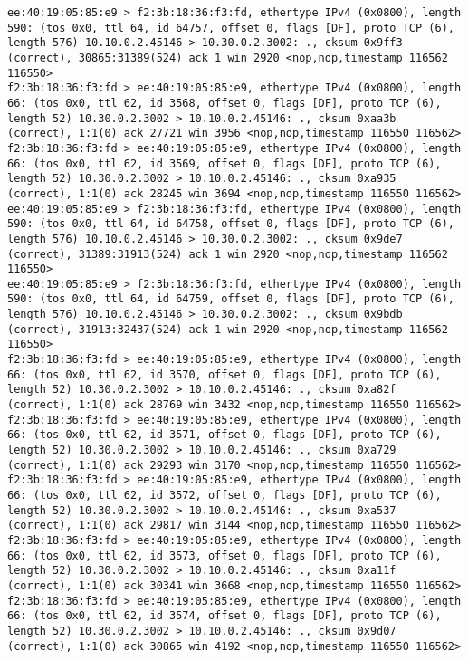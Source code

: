 \documentclass[a4paper,12pt]{article}
\begin{document}
\begin{Verbatim}
ee:40:19:05:85:e9 > f2:3b:18:36:f3:fd, ethertype IPv4 (0x0800), length 590: (tos 0x0, ttl 64, id 64757, offset 0, flags [DF], proto TCP (6), length 576) 10.10.0.2.45146 > 10.30.0.2.3002: ., cksum 0x9ff3 (correct), 30865:31389(524) ack 1 win 2920 <nop,nop,timestamp 116562 116550>
f2:3b:18:36:f3:fd > ee:40:19:05:85:e9, ethertype IPv4 (0x0800), length 66: (tos 0x0, ttl 62, id 3568, offset 0, flags [DF], proto TCP (6), length 52) 10.30.0.2.3002 > 10.10.0.2.45146: ., cksum 0xaa3b (correct), 1:1(0) ack 27721 win 3956 <nop,nop,timestamp 116550 116562>
f2:3b:18:36:f3:fd > ee:40:19:05:85:e9, ethertype IPv4 (0x0800), length 66: (tos 0x0, ttl 62, id 3569, offset 0, flags [DF], proto TCP (6), length 52) 10.30.0.2.3002 > 10.10.0.2.45146: ., cksum 0xa935 (correct), 1:1(0) ack 28245 win 3694 <nop,nop,timestamp 116550 116562>
ee:40:19:05:85:e9 > f2:3b:18:36:f3:fd, ethertype IPv4 (0x0800), length 590: (tos 0x0, ttl 64, id 64758, offset 0, flags [DF], proto TCP (6), length 576) 10.10.0.2.45146 > 10.30.0.2.3002: ., cksum 0x9de7 (correct), 31389:31913(524) ack 1 win 2920 <nop,nop,timestamp 116562 116550>
ee:40:19:05:85:e9 > f2:3b:18:36:f3:fd, ethertype IPv4 (0x0800), length 590: (tos 0x0, ttl 64, id 64759, offset 0, flags [DF], proto TCP (6), length 576) 10.10.0.2.45146 > 10.30.0.2.3002: ., cksum 0x9bdb (correct), 31913:32437(524) ack 1 win 2920 <nop,nop,timestamp 116562 116550>
f2:3b:18:36:f3:fd > ee:40:19:05:85:e9, ethertype IPv4 (0x0800), length 66: (tos 0x0, ttl 62, id 3570, offset 0, flags [DF], proto TCP (6), length 52) 10.30.0.2.3002 > 10.10.0.2.45146: ., cksum 0xa82f (correct), 1:1(0) ack 28769 win 3432 <nop,nop,timestamp 116550 116562>
f2:3b:18:36:f3:fd > ee:40:19:05:85:e9, ethertype IPv4 (0x0800), length 66: (tos 0x0, ttl 62, id 3571, offset 0, flags [DF], proto TCP (6), length 52) 10.30.0.2.3002 > 10.10.0.2.45146: ., cksum 0xa729 (correct), 1:1(0) ack 29293 win 3170 <nop,nop,timestamp 116550 116562>
f2:3b:18:36:f3:fd > ee:40:19:05:85:e9, ethertype IPv4 (0x0800), length 66: (tos 0x0, ttl 62, id 3572, offset 0, flags [DF], proto TCP (6), length 52) 10.30.0.2.3002 > 10.10.0.2.45146: ., cksum 0xa537 (correct), 1:1(0) ack 29817 win 3144 <nop,nop,timestamp 116550 116562>
f2:3b:18:36:f3:fd > ee:40:19:05:85:e9, ethertype IPv4 (0x0800), length 66: (tos 0x0, ttl 62, id 3573, offset 0, flags [DF], proto TCP (6), length 52) 10.30.0.2.3002 > 10.10.0.2.45146: ., cksum 0xa11f (correct), 1:1(0) ack 30341 win 3668 <nop,nop,timestamp 116550 116562>
f2:3b:18:36:f3:fd > ee:40:19:05:85:e9, ethertype IPv4 (0x0800), length 66: (tos 0x0, ttl 62, id 3574, offset 0, flags [DF], proto TCP (6), length 52) 10.30.0.2.3002 > 10.10.0.2.45146: ., cksum 0x9d07 (correct), 1:1(0) ack 30865 win 4192 <nop,nop,timestamp 116550 116562>

\end{Verbatim}
\end{document}
